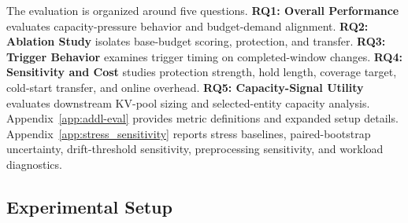 \documentclass[sigplan,10pt, anonymous]{acmart}
\begin{document}
The evaluation is organized around five questions. \textbf{RQ1: Overall Performance} evaluates capacity-pressure behavior and budget-demand alignment. \textbf{RQ2: Ablation Study} isolates base-budget scoring, protection, and transfer. \textbf{RQ3: Trigger Behavior} examines trigger timing on completed-window changes. \textbf{RQ4: Sensitivity and Cost} studies protection strength, hold length, coverage target, cold-start transfer, and online overhead. \textbf{RQ5: Capacity-Signal Utility} evaluates downstream KV-pool sizing and selected-entity capacity analysis. Appendix~\ref{app:addl-eval} provides metric definitions and expanded setup details. Appendix~\ref{app:stress_sensitivity} reports stress baselines, paired-bootstrap uncertainty, drift-threshold sensitivity, preprocessing sensitivity, and workload diagnostics.

\subsection{Experimental Setup}
\label{sec:experimental-setup}
\end{document}
